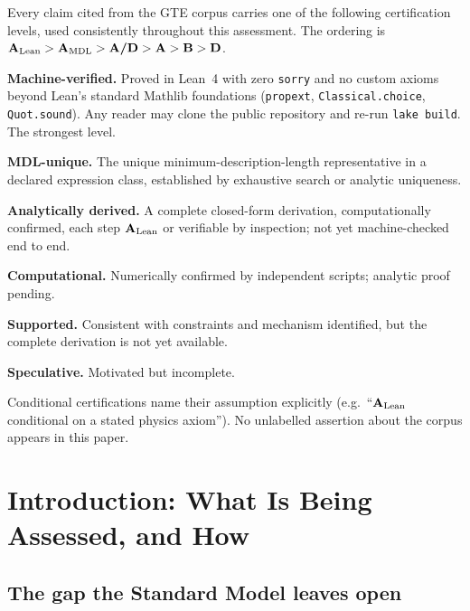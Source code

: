 \documentclass[11pt]{article}
\newcommand{\CatA}{\textbf{A}}
\newcommand{\CatAL}{\ensuremath{\textbf{A}_{\rm Lean}}}
\newcommand{\CatAMDL}{\ensuremath{\textbf{A}_{\rm MDL}}}
\newcommand{\CatAD}{\textbf{A/D}}
\newcommand{\CatB}{\textbf{B}}
\newcommand{\CatD}{\textbf{D}}
\begin{document}
\begin{tcolorbox}[colback=gray!8,colframe=gray!50,title=Claim-Strength Taxonomy,
  fonttitle=\bfseries,breakable]
\small
Every claim cited from the GTE corpus carries one of the following certification
levels, used consistently throughout this assessment.  The ordering is
$\CatAL > \CatAMDL > \CatAD > \CatA > \CatB > \CatD$.
\begin{description}[leftmargin=2.0cm,labelwidth=1.8cm,itemsep=2pt,topsep=3pt]
\item[$\CatAL$] \textbf{Machine-verified.} Proved in Lean~4 with zero
  \texttt{sorry} and no custom axioms beyond Lean's standard Mathlib foundations
  (\texttt{propext}, \texttt{Classical.choice}, \texttt{Quot.sound}).  Any reader
  may clone the public repository and re-run \texttt{lake build}.  The strongest
  level.
\item[$\CatAMDL$] \textbf{MDL-unique.} The unique minimum-description-length
  representative in a declared expression class, established by exhaustive search
  or analytic uniqueness.
\item[$\CatAD$] \textbf{Analytically derived.} A complete closed-form derivation,
  computationally confirmed, each step \CatAL{} or verifiable by inspection; not
  yet machine-checked end to end.
\item[$\CatA$] \textbf{Computational.} Numerically confirmed by independent
  scripts; analytic proof pending.
\item[$\CatB$] \textbf{Supported.} Consistent with constraints and mechanism
  identified, but the complete derivation is not yet available.
\item[$\CatD$] \textbf{Speculative.} Motivated but incomplete.
\end{description}
Conditional certifications name their assumption explicitly (e.g.\ ``\CatAL{}
conditional on a stated physics axiom'').  No unlabelled assertion about the
corpus appears in this paper.
\end{tcolorbox}

\section{Introduction: What Is Being Assessed, and How}
\label{sec:intro}

\subsection{The gap the Standard Model leaves open}
\end{document}
